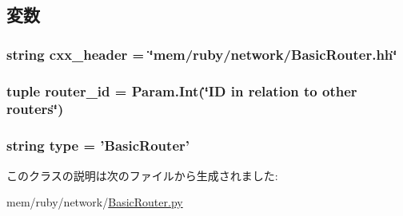 \subsection{変数}
\hypertarget{classBasicRouter_1_1BasicRouter_a17da7064bc5c518791f0c891eff05fda}{
\subsubsection[{cxx\_\-header}]{\setlength{\rightskip}{0pt plus 5cm}string {\bf cxx\_\-header} = \char`\"{}mem/ruby/network/BasicRouter.hh\char`\"{}}}
\label{classBasicRouter_1_1BasicRouter_a17da7064bc5c518791f0c891eff05fda}
\hypertarget{classBasicRouter_1_1BasicRouter_ad868106a54f225398ffb41970f0b6b99}{
\subsubsection[{router\_\-id}]{\setlength{\rightskip}{0pt plus 5cm}tuple {\bf router\_\-id} = Param.Int(\char`\"{}ID in relation to other routers\char`\"{})}}
\label{classBasicRouter_1_1BasicRouter_ad868106a54f225398ffb41970f0b6b99}
\hypertarget{classBasicRouter_1_1BasicRouter_acce15679d830831b0bbe8ebc2a60b2ca}{
\subsubsection[{type}]{\setlength{\rightskip}{0pt plus 5cm}string {\bf type} = '{\bf BasicRouter}'}}
\label{classBasicRouter_1_1BasicRouter_acce15679d830831b0bbe8ebc2a60b2ca}


このクラスの説明は次のファイルから生成されました:\begin{DoxyCompactItemize}
\item 
mem/ruby/network/\hyperlink{BasicRouter_8py}{BasicRouter.py}\end{DoxyCompactItemize}

